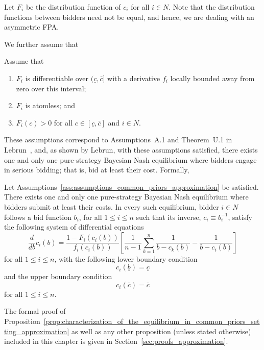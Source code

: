 Let $F_i$ be the distribution function of $c_i$ for all $i\in N$. Note that the distribution functions between bidders need not be equal, and hence, we are dealing with an asymmetric FPA.

We further assume that
\begin{assumptions}
\label{ass:assumptions_common_priors_approximation}
Assume that
\begin{enumerate}
  \item $F_i$ is differentiable over $(\underline{c}, \bar{c}]$ with a derivative $f_i$ locally bounded away from zero over this interval;
  \item $F_i$ is atomless; and
  \item $F_i(c)>0$ for all $c\in [\underline{c}, \bar{c}]$ and $i\in N$.
\end{enumerate}
\end{assumptions}
These assumptions correspond to Assumptions~A.1 and Theorem~U.1 in Lebrun~\cite{Lebrun2006}, and, as shown by Lebrun, with these assumptions satisfied, there exists one and only one pure-strategy Bayesian Nash equilibrium where bidders engage in serious bidding; that is, bid at least their cost. Formally,
\begin{proposition}
\label{prop:characterization_of_the_equilibrium_in_common_priors_setting_approximation}
Let Assumptions~\ref{ass:assumptions_common_priors_approximation} be satisfied. There exists one and only one pure-strategy Bayesian Nash equilibrium where bidders submit at least their costs. In every such equilibrium, bidder $i\in N$ follows a bid function $b_i$, for all $1\leq i\leq n$ such that its inverse, $c_i\equiv b_i^{-1}$, satisfy the following system of differential equations
\begin{equation*}
  \frac{d}{db}c_i(b) = \frac{1 - F_i(c_i(b))}{f_i(c_i(b))}\left[ \frac{1}{n-1}\sum_{k=1}^n \frac{1}{b-c_k(b)} - \frac{1}{b-c_i(b)} \right]
\end{equation*}
for all $1\leq i\leq n$, with the following lower boundary condition
\begin{equation}
  \label{eq:foc_ode_lower_boundary_approximation}
  c_i(\underline{b}) = \underline{c}
\end{equation}
and the upper boundary condition
\begin{equation}
  \label{eq:foc_ode_upper_boundary_approximation}
  c_i(\bar{c}) = \bar{c}
\end{equation}
for all $1\leq i\leq n$.
\end{proposition}
\noindent The formal proof of Proposition~\ref{prop:characterization_of_the_equilibrium_in_common_priors_setting_approximation} as well as any other proposition (unless stated otherwise) included in this chapter is given in Section~\ref{sec:proofs_approximation}.

